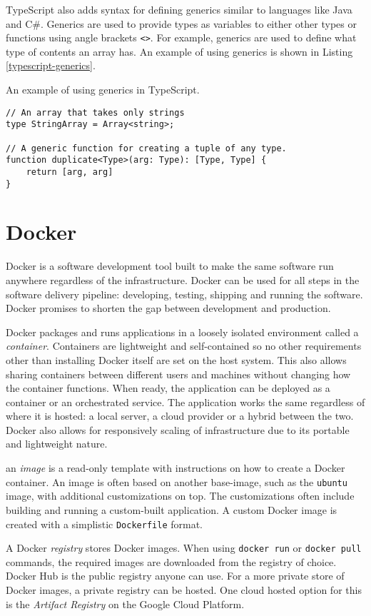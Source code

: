 TypeScript also adds syntax for defining generics similar to languages like Java and C\#.
Generics are used to provide types as variables to either other types or functions using angle brackets \texttt{<>}.
For example, generics are used to define what type of contents an array has.
\cite{typescript}
An example of using generics is shown in Listing \ref{typescript-generics}.

\begin{breakablealgorithm}
\caption{An example of using generics in TypeScript.}
\label{typescript-generics}
\begin{verbatim}
// An array that takes only strings
type StringArray = Array<string>;

// A generic function for creating a tuple of any type.
function duplicate<Type>(arg: Type): [Type, Type] {
    return [arg, arg]
}
\end{verbatim}
\end{breakablealgorithm}

\section{Docker}

Docker is a software development tool built to make the same software run anywhere regardless of the infrastructure.
Docker can be used for all steps in the software delivery pipeline: developing, testing, shipping and running the software.
Docker promises to shorten the gap between development and production.
\cite{docker}

Docker packages and runs applications in a loosely isolated environment called a \textit{container}.
Containers are lightweight and self-contained so no other requirements other than installing Docker itself are set on the host system.
This also allows sharing containers between different users and machines without changing how the container functions.
When ready, the application can be deployed as a container or an orchestrated service.
The application works the same regardless of where it is hosted: a local server, a cloud provider or a hybrid between the two.
Docker also allows for responsively scaling of infrastructure due to its portable and lightweight nature.
\cite{docker}

an \textit{image} is a read-only template with instructions on how to create a Docker container.
An image is often based on another base-image, such as  the \texttt{ubuntu} image, with additional customizations on top.
The customizations often include building and running a custom-built application.
A custom Docker image is created with a simplistic \texttt{Dockerfile} format.
\cite{docker}

A Docker \textit{registry} stores Docker images.
When using \texttt{docker run} or \texttt{docker pull} commands, the required images are downloaded from the registry of choice.
Docker Hub is the public registry anyone can use.
For a more private store of Docker images, a private registry can be hosted.
\cite{docker}
One cloud hosted option for this is the \textit{Artifact Registry} on the Google Cloud Platform.
\cite{googlecloud}
